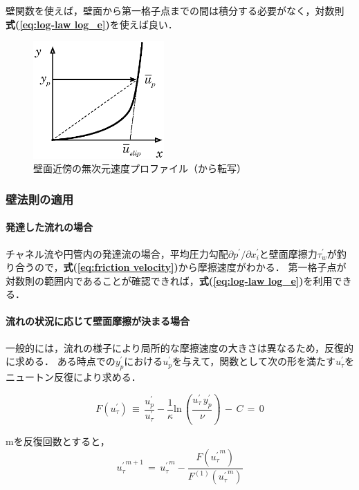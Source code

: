 壁関数を使えば，壁面から第一格子点までの間は積分する必要がなく，対数則 \textbf{式(\ref{eq:log-law log_e})}を使えば良い．

\begin{figure}[htbp]
\begin{center}
\includegraphics[width=5cm,clip]{wallfunc.eps}
\end{center}
\caption{壁面近傍の無次元速度プロファイル（\cite{kajishima:99:simulation}から転写）}
\label{fig:wall func}
\end{figure}


\subsubsection{壁法則の適用}
%
\paragraph{発達した流れの場合}
チャネル流や円管内の発達流の場合，平均圧力勾配$\partial p^{\prime} / \partial x_i^{\prime}$と壁面摩擦力$\tau^{\prime}_w$が釣り合うので，\textbf{式(\ref{eq:friction velocity})}から摩擦速度がわかる．
第一格子点が対数則の範囲内であることが確認できれば，\textbf{式(\ref{eq:log-law log_e})}を利用できる．

%
\paragraph{流れの状況に応じて壁面摩擦が決まる場合}
一般的には，流れの様子により局所的な摩擦速度の大きさは異なるため，反復的に求める．
ある時点での$y_p^{\prime}$における$u_p^{\prime}$を与えて，関数として次の形を満たす$u_{\tau}^{\prime}$をニュートン反復により求める．

\begin{equation}
F(u_{\tau}^{\prime}) \,\equiv \, \frac{u_p^{\prime}}{u_{\tau}^{\prime}} - \frac{1}{\kappa}\mathrm{ln}\,\left( \frac{u_{\tau}^{\prime} \, y_p^{\prime}}{\nu} \right)\,-\,C \,=\,0
\label{eq:wall func newton}
\end{equation}

\noindent mを反復回数とすると，
\begin{equation}
{u_{\tau}^{\prime}}^{m+1} \,=\, {u_{\tau}^{\prime}}^{m} - \frac{F\left( {u_{\tau}^{\prime}}^{m} \right)}{F^{(1)} \left( {u_{\tau}^{\prime}}^{m} \right)}
\label{eq:newton iteration wall func}
\end{equation}


